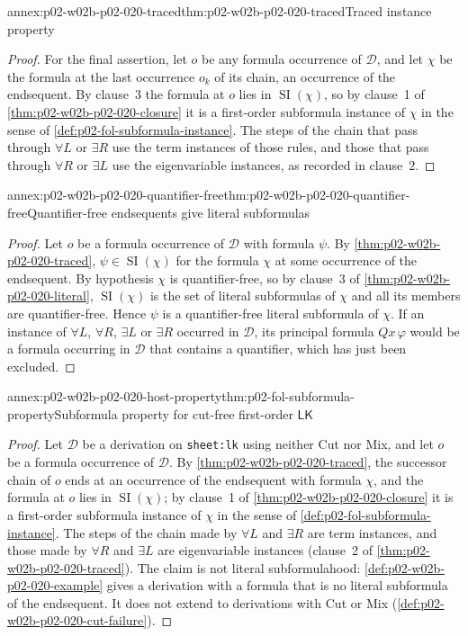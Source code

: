 \begin{annexitem}{annex:p02-w02b-p02-020-traced}{thm:p02-w02b-p02-020-traced}{Traced instance property}
\begin{proof}
For the final assertion, let \(o\) be any formula occurrence of
\(\mathcal D\), and let \(\chi\) be the formula at the last occurrence
\(o_k\) of its chain, an occurrence of the endsequent.  By clause~3 the
formula at \(o\) lies in \(\operatorname{SI}(\chi)\), so by clause~1 of
\cref{thm:p02-w02b-p02-020-closure} it is a first-order subformula instance of
\(\chi\) in the sense of \cref{def:p02-fol-subformula-instance}.  The steps of
the chain that pass through \(\forall L\) or \(\exists R\) use the term
instances of those rules, and those that pass through \(\forall R\) or
\(\exists L\) use the eigenvariable instances, as recorded in clause~2.
\end{proof}
\end{annexitem}

\begin{annexitem}{annex:p02-w02b-p02-020-quantifier-free}{thm:p02-w02b-p02-020-quantifier-free}{Quantifier-free endsequents give literal subformulas}
\begin{proof}
Let \(o\) be a formula occurrence of \(\mathcal D\) with formula \(\psi\).  By
\cref{thm:p02-w02b-p02-020-traced}, \(\psi\in\operatorname{SI}(\chi)\) for the
formula \(\chi\) at some occurrence of the endsequent.  By hypothesis
\(\chi\) is quantifier-free, so by clause~3 of
\cref{thm:p02-w02b-p02-020-literal}, \(\operatorname{SI}(\chi)\) is the set of
literal subformulas of \(\chi\) and all its members are quantifier-free.
Hence \(\psi\) is a quantifier-free literal subformula of \(\chi\).  If an
instance of \(\forall L\), \(\forall R\), \(\exists L\) or \(\exists R\)
occurred in \(\mathcal D\), its principal formula \(Qx\,\varphi\) would be a
formula occurring in \(\mathcal D\) that contains a quantifier, which has just
been excluded.
\end{proof}
\end{annexitem}

\begin{annexitem}{annex:p02-w02b-p02-020-host-property}{thm:p02-fol-subformula-property}{Subformula property for cut-free first-order \(\mathsf{LK}\)}
\begin{proof}
Let \(\mathcal D\) be a derivation on \texttt{sheet:lk}
using neither Cut nor Mix, and let \(o\) be a formula occurrence of
\(\mathcal D\).  By \cref{thm:p02-w02b-p02-020-traced}, the successor chain of
\(o\) ends at an occurrence of the endsequent with formula \(\chi\), and the
formula at \(o\) lies in \(\operatorname{SI}(\chi)\); by clause~1 of
\cref{thm:p02-w02b-p02-020-closure} it is a first-order subformula instance of
\(\chi\) in the sense of \cref{def:p02-fol-subformula-instance}.  The steps of
the chain made by \(\forall L\) and \(\exists R\) are term instances, and
those made by \(\forall R\) and \(\exists L\) are eigenvariable instances
(clause~2 of \cref{thm:p02-w02b-p02-020-traced}).  The claim is not literal
subformulahood: \cref{def:p02-w02b-p02-020-example} gives a derivation with a
formula that is no literal subformula of the endsequent.  It does not extend to
derivations with Cut or Mix (\cref{def:p02-w02b-p02-020-cut-failure}).
\end{proof}
\end{annexitem}
